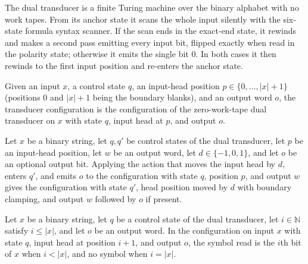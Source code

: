 \begin{definition}
\label{Complexity.tautDualTM}
\leanok
{}
The dual transducer is a finite Turing machine over the binary alphabet with no work
tapes. From its anchor state it scans the whole input silently with the six-state
formula syntax scanner. If the scan ends in the exact-end state, it rewinds and makes
a second pass emitting every input bit, flipped exactly when read in the polarity
state; otherwise it emits the single bit $0$. In both cases it then rewinds to the
first input position and re-enters the anchor state.
\end{definition}

\begin{definition}
\label{Complexity.tautDualCfg}
\leanok
{}
Given an input $x$, a control state $q$, an input-head position
$p \in \{0, \dots, |x| + 1\}$ (positions $0$ and $|x|+1$ being the boundary blanks),
and an output word $o$, the transducer configuration is the configuration of the
zero-work-tape dual transducer on $x$ with state $q$, input head at $p$, and output
$o$.
\end{definition}

\begin{lemma}
\label{Complexity.tautDual_action}
\leanok
{}
Let $x$ be a binary string, let $q,q'$ be control states of the dual transducer, let $p$
be an input-head position, let $w$ be an output word, let $d\in\{-1,0,1\}$, and let $o$
be an optional output bit. Applying the action that moves the input head by $d$, enters
$q'$, and emits $o$ to the configuration with state $q$, position $p$, and output $w$
gives the configuration with state $q'$, head position moved by $d$ with boundary
clamping, and output $w$ followed by $o$ if present.
\end{lemma}

\begin{lemma}
\label{Complexity.tautDual_read}
\leanok
{}
Let $x$ be a binary string, let $q$ be a control state of the dual transducer, let
$i\in\mathbb{N}$ satisfy $i\le |x|$, and let $o$ be an output word. In the configuration
on input $x$ with state $q$, input head at position $i+1$, and output $o$, the symbol
read is the $i$th bit of $x$ when $i<|x|$, and no symbol when $i=|x|$.
\end{lemma}

